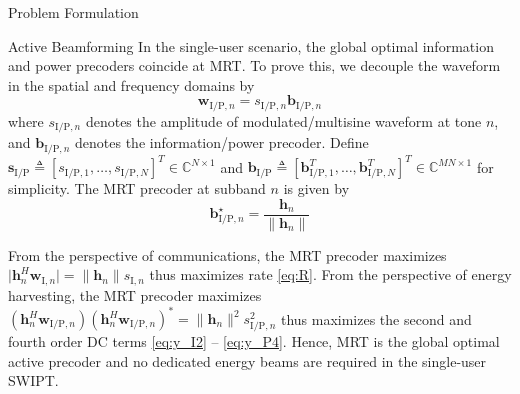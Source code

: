 \documentclass[journal]{IEEEtran}
\begin{document}
\begin{section}{Problem Formulation}
		\begin{subsection}{Active Beamforming}
			In the single-user scenario, the global optimal information and power precoders coincide at MRT. To prove this, we decouple the waveform in the spatial and frequency domains by
			\begin{equation}\label{eq:w}
				\boldsymbol{w}_{\mathrm{I/P}, n} = s_{\mathrm{I/P}, n} \boldsymbol{b}_{\mathrm{I/P}, n}
			\end{equation}
			where $s_{\mathrm{I/P},n}$ denotes the amplitude of modulated/multisine waveform at tone $n$, and $\boldsymbol{b}_{\mathrm{I/P}, n}$ denotes the information/power precoder. Define $\boldsymbol{s}_{\mathrm{I/P}} \triangleq [s_{\mathrm{I/P},1},\dots,s_{\mathrm{I/P},N}]^T \in \mathbb{C}^{N \times 1}$ and $\boldsymbol{b}_{\mathrm{I/P}} \triangleq [\boldsymbol{b}_{\mathrm{I/P}, 1}^T,\dots,\boldsymbol{b}_{\mathrm{I/P}, N}^T]^T \in \mathbb{C}^{MN \times 1}$ for simplicity. The MRT precoder at subband $n$ is given by
			\begin{equation}\label{eq:b}
				\boldsymbol{b}_{\mathrm{I/P}, n}^\star = \frac{\boldsymbol{h}_n}{\lVert{\boldsymbol{h}_n}\rVert}
			\end{equation}

			From the perspective of communications, the MRT precoder maximizes $\lvert{\boldsymbol{h}_{n}^H \boldsymbol{w}_{\mathrm{I}, n}}\rvert = \lVert{\boldsymbol{h}_{n}}\rVert s_{\mathrm{I}, n}$ thus maximizes rate \eqref{eq:R}. From the perspective of energy harvesting, the MRT precoder maximizes $(\boldsymbol{h}_{n}^H \boldsymbol{w}_{\mathrm{I/P}, n})(\boldsymbol{h}_{n}^H \boldsymbol{w}_{\mathrm{I/P}, n})^* = \lVert{\boldsymbol{h}_{n}}\rVert^2 s_{\mathrm{I/P}, n}^2$ thus maximizes the second and fourth order DC terms \eqref{eq:y_I2} -- \eqref{eq:y_P4}. Hence, MRT is the global optimal active precoder and no dedicated energy beams are required in the single-user SWIPT.
		\end{subsection}



\end{section}
\end{document}
